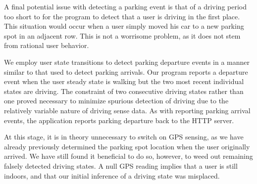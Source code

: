 A final potential issue with detecting a parking event is that of a driving
period too short to for the program to detect that a user is driving in
the first place.  This situation would occur when a user simply moved his
car to a new parking spot in an adjacent row.  This is not a worrisome
problem, as it does not stem from rational user behavior.

We employ user state transitions to detect parking departure events in a 
manner similar to that used to detect parking arrivals.  Our program
reports a departure event when the user steady state is walking but the
two most recent individual states are driving.  The constraint of two
consecutive driving states rather than one proved necessary to minimize
spurious detection of driving due to the relatively variable nature of
driving sense data.  As with reporting parking arrival events, the
application reports parking departure back to the HTTP server.

At this stage, it is in theory unnecessary to switch on GPS sensing, as
we have already previously determined the parking spot location when the
user originally arrived.  We have still found it beneficial to do so,
however, to weed out remaining falsely detected driving states.  A null
GPS reading implies that a user is still indoors, and that our initial
inference of a driving state was misplaced.


